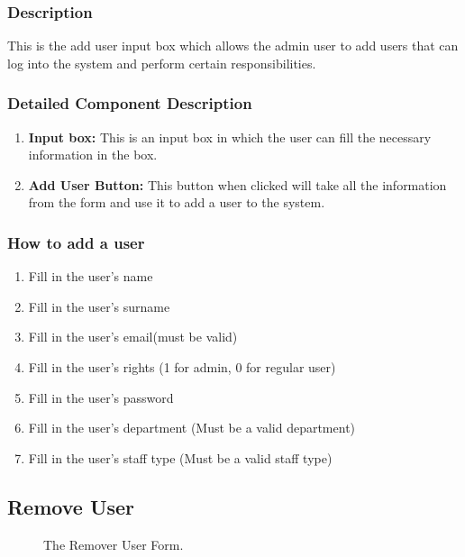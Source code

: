 \documentclass[14pt, a4paper]{article}
\begin{document}
\subsubsection{Description} This is the add user input box which allows the admin user to add users that can log into the system and perform certain responsibilities.
\subsubsection{Detailed Component Description}
\begin{enumerate}
\item \textbf{Input box:} This is an input box in which the user can fill the necessary information in the box.
\item \textbf{Add User Button:} This button when clicked will take all the information from the form and use it to add a user to the system.
\end{enumerate}
\subsubsection{How to add a user}
\begin{enumerate}
\item Fill in the user's name
\item Fill in the user's surname
\item Fill in the user's email(must be valid)
\item Fill in the user's rights (1 for admin, 0 for regular user)
\item Fill in the user's password
\item Fill in the user's department (Must be a valid department)
\item Fill in the user's staff type (Must be a valid staff type)
\end{enumerate}
\subsection{Remove User}
\begin{figure}[H]
\centerline{}
\caption{The Remover User Form.}
\label{fig:removeUser1}
\end{figure}
\end{document}
